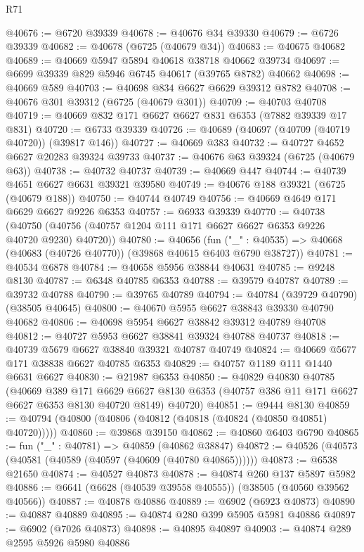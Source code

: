 \begin{lexlean}{R71}
\begin{coremodule}
@40676 := @6720 @39339
@40678 := @40676 @34 @39330
@40679 := @6726 @39339
@40682 := @40678 (@6725 (@40679 @34))
@40683 := @40675 @40682
@40689 := @40669 @5947 @5894 @40618 @38718 @40662 @39734
@40697 := @6699 @39339 @829 @5946 @6745 @40617 (@39765 @8782) @40662
@40698 := @40669 @589
@40703 := @40698 @834 @6627 @6629 @39312 @8782
@40708 := @40676 @301 @39312 (@6725 (@40679 @301))
@40709 := @40703 @40708
@40719 := @40669 @832 @171 @6627 @6627 @831 @6353 (@7882 @39339 @17 @831)
@40720 := @6733 @39339
@40726 := @40689 (@40697 (@40709 (@40719 @40720)) (@39817 @146))
@40727 := @40669 @383
@40732 := @40727 @4652 @6627 @20283 @39324 @39733
@40737 := @40676 @63 @39324 (@6725 (@40679 @63))
@40738 := @40732 @40737
@40739 := @40669 @447
@40744 := @40739 @4651 @6627 @6631 @39321 @39580
@40749 := @40676 @188 @39321 (@6725 (@40679 @188))
@40750 := @40744 @40749
@40756 := @40669 @4649 @171 @6629 @6627 @9226 @6353
@40757 := @6933 @39339
@40770 := @40738
    (@40750 (@40756 (@40757 @1204 @111 @171 @6627 @6627 @6353 @9226 @40720 @9230) @40720))
@40780 := @40656
    (fun ("_" : @40535) => @40668 (@40683 (@40726 @40770)) (@39868 @40615 @6403 @6790 @38727))
@40781 := @40534 @6878
@40784 := @40658 @5956 @38844 @40631
@40785 := @9248 @8130
@40787 := @6348 @40785 @6353
@40788 := @39579 @40787
@40789 := @39732 @40788
@40790 := @39765 @40789
@40794 := @40784 (@39729 @40790) (@38505 @40645)
@40800 := @40670 @5955 @6627 @38843 @39330 @40790 @40682
@40806 := @40698 @5954 @6627 @38842 @39312 @40789 @40708
@40812 := @40727 @5953 @6627 @38841 @39324 @40788 @40737
@40818 := @40739 @5679 @6627 @38840 @39321 @40787 @40749
@40824 := @40669 @5677 @171 @38838 @6627 @40785 @6353
@40829 := @40757 @1189 @111 @1440 @6631 @6627
@40830 := @21987 @6353
@40850 := @40829
    @40830
    @40785
    (@40669
      @389
      @171
      @6629
      @6627
      @8130
      @6353
      (@40757 @386 @11 @171 @6627 @6627 @6353 @8130 @40720 @8149)
      @40720)
@40851 := @9444 @8130
@40859 := @40794 (@40800 (@40806 (@40812 (@40818 (@40824 (@40850 @40851) @40720)))))
@40860 := @39868 @39150
@40862 := @40860 @6403 @6790
@40865 := fun ("_" : @40781) => @40859 (@40862 @38847)
@40872 := @40526 (@40573 (@40581 (@40589 (@40597 (@40609 (@40780 @40865))))))
@40873 := @6538 @21650
@40874 := @40527 @40873
@40878 := @40874 @260 @137 @5897 @5982
@40886 := @6641 (@6628 (@40539 @39558 @40555)) (@38505 (@40560 @39562 @40566))
@40887 := @40878 @40886
@40889 := @6902 (@6923 @40873)
@40890 := @40887 @40889
@40895 := @40874 @280 @399 @5905 @5981 @40886
@40897 := @6902 (@7026 @40873)
@40898 := @40895 @40897
@40903 := @40874 @289 @2595 @5926 @5980 @40886

\end{coremodule}
\end{lexlean}
